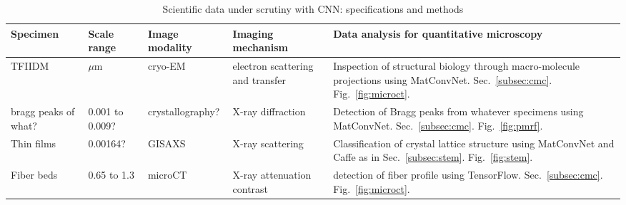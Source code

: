 
\begin{table*}[!]
\centering
\caption{Scientific data under scrutiny with CNN: specifications and methods}
\label{table1}
\begin{tabular}{p{2cm}p{1.6cm}p{1.6cm}p{3cm}p{7.5cm}}
\hline
\rowcolor[HTML]{CCE5FF}
Specimen  &  Scale range  &  Image \newline modality  &  Imaging  \newline mechanism  &  Data analysis for quantitative microscopy
\\
\hline
\rowcolor[HTML]{FFFFFF} %
TFIIDM & $\mu$m & cryo-EM & electron scattering and transfer & Inspection of structural biology through macro-molecule projections using MatConvNet. Sec.~\ref{subsec:cmc}. Fig.~\ref{fig:microct}.
\\
\hline
\rowcolor[HTML]{F6F6F6} %
bragg peaks of what? & 0.001 to 0.009?  & crystallography? & X-ray diffraction  & Detection of Bragg peaks from whatever specimens using MatConvNet. Sec.~\ref{subsec:cmc}. Fig.~\ref{fig:pmrf}.
\\
\hline
\rowcolor[HTML]{FFFFFF} %
Thin films   & 0.00164?  & GISAXS  & X-ray scattering & Classification of crystal lattice structure using MatConvNet and Caffe as in Sec.~\ref{subsec:stem}. Fig.~\ref{fig:stem}.
\\
\hline
\rowcolor[HTML]{F6F6F6} %
Fiber beds & 0.65 to 1.3 & microCT  & X-ray attenuation contrast & detection of fiber profile using TensorFlow. Sec.~\ref{subsec:cmc}. Fig.~\ref{fig:microct}.
\\
\hline
\end{tabular}
\end{table*}

